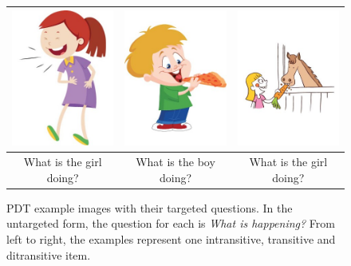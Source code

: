 \begin{figure}[htb!]
\begin{center}
\begin{tabular}{|c|c|c|}
\hline
{\includegraphics[width=0.29\columnwidth]{figures/I20.jpg}} & {\includegraphics[width=0.3\columnwidth]{figures/I02.jpg}} & {\includegraphics[width=0.3\columnwidth]{figures/I17.jpg}} \\
\hline
What is the girl doing? & What is the boy doing? & What is the girl doing? \\
\hline
\end{tabular}
\caption{\label{fig:example-pdt-items} PDT example images with their targeted questions. In the untargeted form, the question for each is \textit{What is happening?} From left to right, the examples represent one intransitive, transitive and ditransitive item.}
\end{center}
\end{figure}

